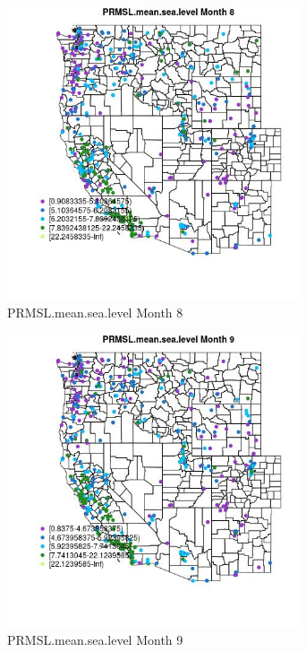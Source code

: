 \begin{figure} 
\centering  
\includegraphics[width=0.77\textwidth]{Code_Outputs/ML_input_report_ML_input_PM25_Step5_part_d_de_duplicated_aves_ML_input_MapObsMo8PRMSLmeansealevel.jpg} 
\caption{\label{fig:ML_input_report_ML_input_PM25_Step5_part_d_de_duplicated_aves_ML_inputMapObsMo8PRMSLmeansealevel}PRMSL.mean.sea.level Month 8} 
\end{figure} 
 

\begin{figure} 
\centering  
\includegraphics[width=0.77\textwidth]{Code_Outputs/ML_input_report_ML_input_PM25_Step5_part_d_de_duplicated_aves_ML_input_MapObsMo9PRMSLmeansealevel.jpg} 
\caption{\label{fig:ML_input_report_ML_input_PM25_Step5_part_d_de_duplicated_aves_ML_inputMapObsMo9PRMSLmeansealevel}PRMSL.mean.sea.level Month 9} 
\end{figure} 
 

